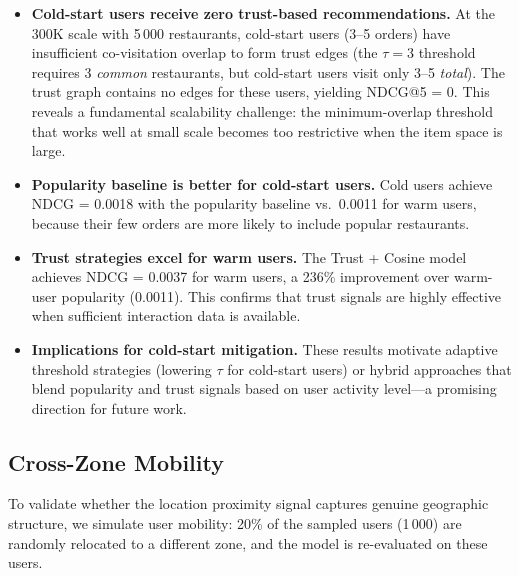 \documentclass[conference]{IEEEtran}
\begin{document}
\begin{itemize}
  \item \textbf{Cold-start users receive zero trust-based recommendations.}
        At the 300K scale with 5\,000 restaurants, cold-start users (3--5
        orders) have insufficient co-visitation overlap to form trust
        edges (the $\tau = 3$ threshold requires 3 \emph{common}
        restaurants, but cold-start users visit only 3--5 \emph{total}).
        The trust graph contains no edges for these users, yielding
        NDCG@5 = 0.  This reveals a fundamental scalability challenge:
        the minimum-overlap threshold that works well at small scale
        becomes too restrictive when the item space is large.

  \item \textbf{Popularity baseline is better for cold-start users.}
        Cold users achieve NDCG = 0.0018 with the popularity baseline
        vs.\ 0.0011 for warm users, because their few orders are more
        likely to include popular restaurants.

  \item \textbf{Trust strategies excel for warm users.}
        The Trust + Cosine model achieves NDCG = 0.0037 for warm users,
        a 236\% improvement over warm-user popularity (0.0011).  This
        confirms that trust signals are highly effective when sufficient
        interaction data is available.

  \item \textbf{Implications for cold-start mitigation.}
        These results motivate adaptive threshold strategies (lowering
        $\tau$ for cold-start users) or hybrid approaches that blend
        popularity and trust signals based on user activity level---a
        promising direction for future work.
\end{itemize}

\subsection{Cross-Zone Mobility}
\label{sec:crosszone}

To validate whether the location proximity signal captures genuine
geographic structure, we simulate user mobility: 20\% of the sampled
users (1\,000) are randomly relocated to a different zone, and the model
is re-evaluated on these users.
\end{document}
